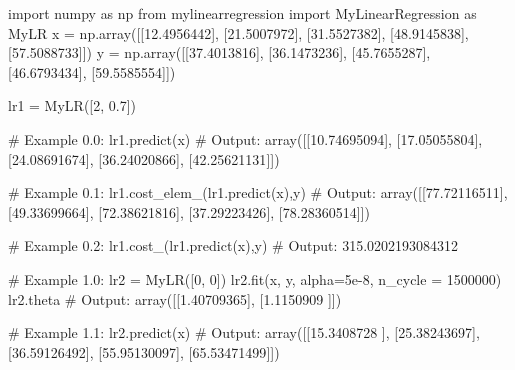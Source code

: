 \documentclass[]{article}
\newenvironment{Shaded}{\begin{snugshade}}{\end{snugshade}}
\newcommand{\CommentTok}[1]{\textcolor[rgb]{0.48,0.49,0.49}{#1}}
\newcommand{\DecValTok}[1]{\textcolor[rgb]{0.96,0.45,0.00}{#1}}
\newcommand{\FloatTok}[1]{\textcolor[rgb]{0.96,0.45,0.00}{#1}}
\newcommand{\ImportTok}[1]{\textcolor[rgb]{0.15,0.68,0.38}{#1}}
\newcommand{\NormalTok}[1]{\textcolor[rgb]{0.81,0.81,0.76}{#1}}
\newcommand{\OperatorTok}[1]{\textcolor[rgb]{0.81,0.81,0.76}{#1}}
\begin{document}
\begin{Shaded}
\begin{Highlighting}[]
\ImportTok{import}\NormalTok{ numpy }\ImportTok{as}\NormalTok{ np}
\ImportTok{from}\NormalTok{ mylinearregression }\ImportTok{import}\NormalTok{ MyLinearRegression }\ImportTok{as}\NormalTok{ MyLR}
\NormalTok{x }\OperatorTok{=}\NormalTok{ np.array([[}\FloatTok{12.4956442}\NormalTok{], [}\FloatTok{21.5007972}\NormalTok{], [}\FloatTok{31.5527382}\NormalTok{], [}\FloatTok{48.9145838}\NormalTok{], [}\FloatTok{57.5088733}\NormalTok{]])}
\NormalTok{y }\OperatorTok{=}\NormalTok{ np.array([[}\FloatTok{37.4013816}\NormalTok{], [}\FloatTok{36.1473236}\NormalTok{], [}\FloatTok{45.7655287}\NormalTok{], [}\FloatTok{46.6793434}\NormalTok{], [}\FloatTok{59.5585554}\NormalTok{]])}

\NormalTok{lr1 }\OperatorTok{=}\NormalTok{ MyLR([}\DecValTok{2}\NormalTok{, }\FloatTok{0.7}\NormalTok{])}

\CommentTok{# Example 0.0:}
\NormalTok{lr1.predict(x)}
\CommentTok{# Output:}
\NormalTok{array([[}\FloatTok{10.74695094}\NormalTok{],}
\NormalTok{       [}\FloatTok{17.05055804}\NormalTok{],}
\NormalTok{       [}\FloatTok{24.08691674}\NormalTok{],}
\NormalTok{       [}\FloatTok{36.24020866}\NormalTok{],}
\NormalTok{       [}\FloatTok{42.25621131}\NormalTok{]])}

\CommentTok{# Example 0.1:}
\NormalTok{lr1.cost_elem_(lr1.predict(x),y)}
\CommentTok{# Output:}
\NormalTok{array([[}\FloatTok{77.72116511}\NormalTok{],}
\NormalTok{       [}\FloatTok{49.33699664}\NormalTok{],}
\NormalTok{       [}\FloatTok{72.38621816}\NormalTok{],}
\NormalTok{       [}\FloatTok{37.29223426}\NormalTok{],}
\NormalTok{       [}\FloatTok{78.28360514}\NormalTok{]])}

\CommentTok{# Example 0.2:}
\NormalTok{lr1.cost_(lr1.predict(x),y)}
\CommentTok{# Output:}
\FloatTok{315.0202193084312}


\CommentTok{# Example 1.0:}
\NormalTok{lr2 }\OperatorTok{=}\NormalTok{ MyLR([}\DecValTok{0}\NormalTok{, }\DecValTok{0}\NormalTok{])}
\NormalTok{lr2.fit(x, y, alpha}\OperatorTok{=}\FloatTok{5e-8}\NormalTok{, n_cycle }\OperatorTok{=} \DecValTok{1500000}\NormalTok{)}
\NormalTok{lr2.theta}
\CommentTok{# Output:}
\NormalTok{array([[}\FloatTok{1.40709365}\NormalTok{],}
\NormalTok{       [}\FloatTok{1.1150909}\NormalTok{ ]])}

\CommentTok{# Example 1.1:}
\NormalTok{lr2.predict(x)}
\CommentTok{# Output:}
\NormalTok{array([[}\FloatTok{15.3408728}\NormalTok{ ],}
\NormalTok{       [}\FloatTok{25.38243697}\NormalTok{],}
\NormalTok{       [}\FloatTok{36.59126492}\NormalTok{],}
\NormalTok{       [}\FloatTok{55.95130097}\NormalTok{],}
\NormalTok{       [}\FloatTok{65.53471499}\NormalTok{]])}


\end{Highlighting}
\end{Shaded}
\end{document}
